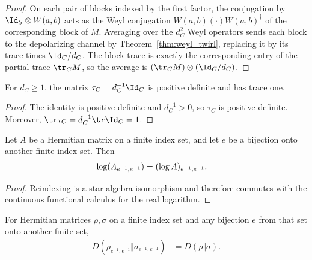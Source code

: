 \begin{proof}\leanok
    On each pair of blocks indexed by the first factor, the conjugation by
    $\Id_S\otimes W(a,b)$ acts as the Weyl conjugation
    $W(a,b)(\cdot)W(a,b)^\dagger$ of the corresponding block of $M$.
    Averaging over the $d_C^2$ Weyl operators sends each block to the
    depolarizing channel by Theorem~\ref{thm:weyl_twirl}, replacing it by its
    trace times $\Id_C/d_C$. The block trace is exactly the corresponding
    entry of the partial trace $\tr_C M$, so the average is
    $(\tr_C M)\otimes(\Id_C/d_C)$.
\end{proof}

\begin{theorem}
    \label{thm:maximally_mixed_ancilla}
    \leanok
    For $d_C\ge1$, the matrix $\tau_C=d_C^{-1}\Id_C$ is positive
    definite and has trace one.
\end{theorem}

\begin{proof}\leanok
    The identity is positive definite and $d_C^{-1}>0$, so $\tau_C$ is positive
    definite. Moreover, $\tr\tau_C=d_C^{-1}\tr\Id_C=1$.
\end{proof}

\begin{theorem}
    \label{thm:log_submatrix_equiv}
    \leanok
    Let $A$ be a Hermitian matrix on a finite index set, and let $e$ be a
    bijection onto another finite index set. Then
    \begin{align}
        \log(A_{e^{-1},e^{-1}})
         & =(\log A)_{e^{-1},e^{-1}}.
        \notag
    \end{align}
\end{theorem}

\begin{proof}\leanok
    Reindexing is a star-algebra isomorphism and therefore commutes with the
    continuous functional calculus for the real logarithm.
\end{proof}

\begin{lemma}
    \label{lem:relative_entropy_submatrix_equiv}
    \leanok
    For Hermitian matrices $\rho,\sigma$ on a finite index set and any bijection
    $e$ from that set onto another finite set,
    \begin{align}
        D(\rho_{e^{-1},e^{-1}}\Vert\sigma_{e^{-1},e^{-1}})
         & =D(\rho\Vert\sigma).
        \label{eq:entropy_reindexing}
    \end{align}
\end{lemma}


